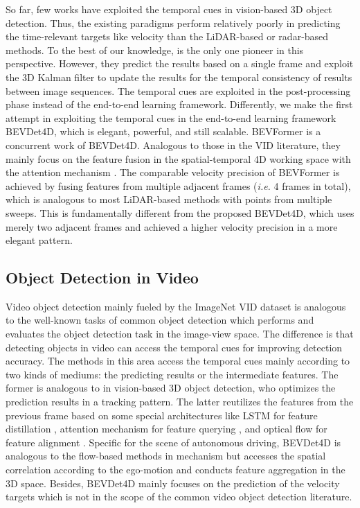 \documentclass[10pt,twocolumn,letterpaper]{article}
\begin{document}
So far, few works have exploited the temporal cues in vision-based 3D object detection. Thus, the existing paradigms \cite{FCOS3D, PGD, DETR3D, PETR, BEVDet} perform relatively poorly in predicting the time-relevant targets like velocity than the LiDAR-based \cite{CenterPoint3D} or radar-based \cite{Centerfusion} methods. To the best of our knowledge, \cite{brazil2020kinematic} is the only one pioneer in this perspective. However, they predict the results based on a single frame and exploit the 3D Kalman filter to update the results for the temporal consistency of results between image sequences. The temporal cues are exploited in the post-processing phase instead of the end-to-end learning framework. Differently, we make the first attempt in exploiting the temporal cues in the end-to-end learning framework BEVDet4D, which is elegant, powerful, and still scalable. BEVFormer \cite{BEVFormer} is a concurrent work of BEVDet4D. Analogous to those \cite{chen2020memory, deng2019object, deng2019relation} in the VID literature, they mainly focus on the feature fusion in the spatial-temporal 4D working space with the attention mechanism \cite{Transformer}. The comparable velocity precision of BEVFormer is achieved by fusing features from multiple adjacent frames (\textit{i.e.} 4 frames in total), which is analogous to most LiDAR-based methods \cite{NS, CenterPoint3D} with points from multiple sweeps. This is fundamentally different from the proposed BEVDet4D, which uses merely two adjacent frames and achieved a higher velocity precision in a more elegant pattern.

\subsection{Object Detection in Video}
Video object detection mainly fueled by the ImageNet VID dataset \cite{ImageNetVID} is analogous to the well-known tasks of common object detection \cite{COCO} which performs and evaluates the object detection task in the image-view space. The difference is that detecting objects in video can access the temporal cues for improving detection accuracy. The methods in this area access the temporal cues mainly according to two kinds of mediums: the predicting results or the intermediate features. The former \cite{TAFVOD} is analogous to \cite{brazil2020kinematic} in vision-based 3D object detection, who optimizes the prediction results in a tracking pattern. The latter reutilizes the features from the previous frame based on some special architectures like LSTM \cite{LSTM} for feature distillation \cite{liu2019looking,liu2018mobile,lu2017online}, attention mechanism \cite{Transformer} for feature querying \cite{chen2020memory, deng2019object, deng2019relation}, and optical flow \cite{Flownet} for feature alignment \cite{zhu2017flow, zhu2018towards}. Specific for the scene of autonomous driving, BEVDet4D is analogous to the flow-based methods in mechanism but accesses the spatial correlation according to the ego-motion and conducts feature aggregation in the 3D space. Besides, BEVDet4D mainly focuses on the prediction of the velocity targets which is not in the scope of the common video object detection literature.
\end{document}
